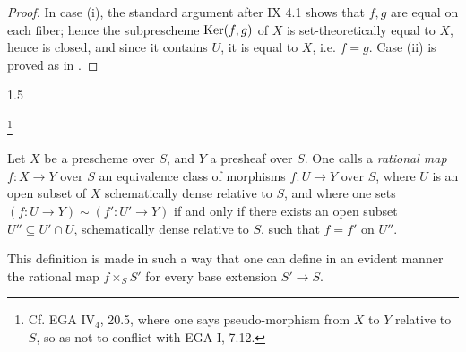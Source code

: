 \begin{proof}
In case (i), the standard argument after IX 4.1 shows
that \(f,g\) are equal on each fiber; hence the
subprescheme \(\operatorname{Ker}(f,g)\) of \(X\) is set-theoretically
equal to \(X\), hence is closed, and since it contains
\(U\), it is equal to \(X\), i.e. \(f=g\).
Case (ii) is proved as in \loccit.
\end{proof}
\begin{definition}{1.5}\label{XVIII.1.5}
{\renewcommand{\thefootnote}{(*)}\addtocounter{footnote}{-1}%
\footnote{Cf. EGA IV$_4$, 20.5, where one says
\og pseudo-morphism from \(X\) to \(Y\) relative to \(S\)\fg,
so as not to conflict with EGA I, 7.12.}}
Let \(X\) be a prescheme over \(S\), and \(Y\) a presheaf
over \(S\). One calls a \emph{rational map}
\(f:X\to Y\) over \(S\) an equivalence class of morphisms
\(f:U\to Y\) over \(S\), where \(U\) is an open subset
of \(X\) schematically dense relative to \(S\), and
where one sets \((f:U\to Y)\sim(f':U'\to Y)\) if and
only if there exists an open subset \(U''\subseteq U'\cap U\),
schematically dense relative to \(S\), such that
\(f=f'\) on \(U''\).
\end{definition}
This definition is made in such a way that one can
define in an evident manner the rational map
\(f\times_S S'\) for every base extension \(S'\to S\).

